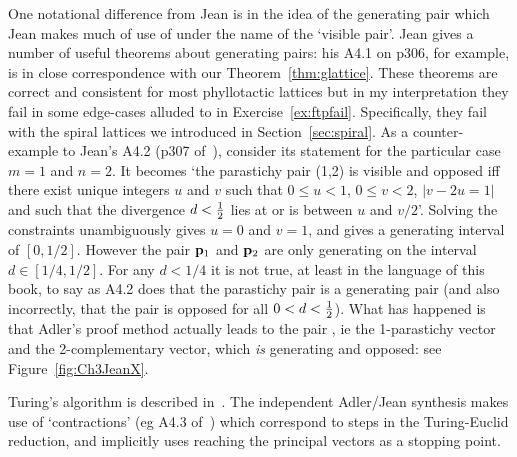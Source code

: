 One notational difference from Jean is in the idea of the generating pair which Jean makes much of use of under the name of the `visible pair'. Jean gives a number of useful theorems about generating pairs: his A4.1 on p306, for example,  is in close correspondence with our Theorem~\ref{thm:glattice}. These theorems are correct and consistent for most phyllotactic lattices but in my interpretation they fail in some edge-cases  alluded to in Exercise~\ref{ex:ftpfail}. Specifically, they fail with the spiral lattices we introduced in Section~\ref{sec:spiral}.
As a counter-example to Jean's A4.2 (p307 of~\cite{jeanPhyllotaxisSystemicStudy1994}), consider its statement for the particular case  $m=1$ and $n=2$. It becomes `the parastichy pair (1,2) is visible and opposed iff there exist unique integers $u$ and $v$ such that $0\leq u<1$, $0\leq v<2$, $|v-2u=1|$ and such that the divergence $d<\textstyle{\frac{1}{2}}$ lies at or is between $u$ and $v/2$'. Solving the constraints unambiguously gives $u=0$ and $v=1$, and gives a generating interval of $[0,1/2]$.  However the pair ${\mathbf p}_{1}$ and ${\mathbf p}_{2}$ are only generating on the interval $d\in [1/4,1/2]$. 
 For any $d<1/4$ it is not true, at least in the language of this book, to say as  
 A4.2 does that the parastichy pair   is a generating pair (and also incorrectly, that the pair is opposed for all $0<d<\textstyle{\frac{1}{2}}$).  What has happened is that Adler's proof method actually leads to the pair , ie the 1-parastichy vector and the 2-complementary vector, which \textit{is} generating and opposed: see Figure~\ref{fig:Ch3JeanX}.
 


Turing's algorithm is described in~\cite{turingMorphogenTheoryPhyllotaxis2013}. The independent Adler/Jean synthesis  makes use of `contractions' (eg A4.3 of~\cite{jeanPhyllotaxisSystemicStudy1994}) which correspond to steps in the Turing-Euclid reduction, and implicitly uses reaching the principal  vectors as a stopping point. 

